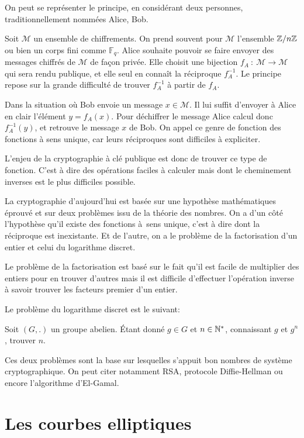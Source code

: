 On peut se représenter le principe, en considérant deux personnes, traditionnellement
nommées
Alice, Bob.

Soit $\mathcal{M}$ un ensemble de chiffrements. On prend souvent pour $\mathcal{M}$
l'ensemble $\mathbb{Z} / n \mathbb{Z}$ ou bien un corps fini comme $\mathbb{F}_{q}$. Alice souhaite pouvoir se faire envoyer des
messages chiffrés de $\mathcal{M}$ de façon privée. Elle choisit une bijection $f_{A}\ :\
\mathcal{M}\to \mathcal{M}$ qui sera rendu publique, et elle seul en connaît la réciproque
$f_{A}^{-1}$. Le principe repose sur la grande difficulté de trouver $f_{A}^{-1}$ à partir de
$f_{A}$. 

Dans la situation où Bob envoie un message $x \in \mathcal{M}$. Il lui suffit
d'envoyer à Alice en clair l'élément $y = f_{A}(x)$. Pour déchiffrer le message Alice
calcul donc $f_{A}^{-1}(y)$, et retrouve le message $x$ de Bob. On appel ce genre de
fonction des fonctions à sens unique, car leurs réciproques sont difficiles à expliciter.

L'enjeu de la cryptographie à clé publique est donc de trouver ce type de fonction.
C'est à dire des opérations faciles à calculer mais dont le cheminement inverses est le plus
difficiles possible.

La cryptographie d'aujourd'hui est basée sur une hypothèse mathématiques éprouvé et sur deux
problèmes issu de la théorie des nombres. On a d'un côté l'hypothèse qu'il existe des
fonctions à sens unique, c'est à dire dont la réciproque est inexistante. Et de l'autre, on a
le problème de la factorisation d'un entier et celui du logarithme discret.

Le problème de la factorisation est basé sur le fait qu'il est facile de multiplier des
entiers pour en trouver d'autres mais il est difficile d'effectuer l'opération inverse à
savoir trouver les facteurs premier d'un entier.

Le problème du logarithme discret est le suivant: 

Soit $(G,.)$ un groupe abelien. Étant donné $g \in G$ et $n \in \mathbb{N}^*$, connaissant $g$ et
$g^{n}$, trouver $n$.

Ces deux problèmes sont la base sur lesquelles s'appuit bon nombres de système
cryptographique. On peut citer notamment RSA, protocole Diffie-Hellman ou encore
l'algorithme d'El-Gamal.


\section{Les courbes elliptiques}

